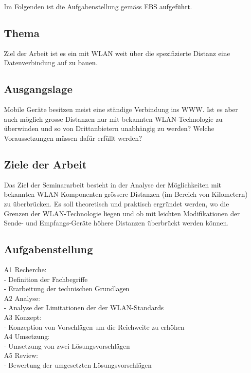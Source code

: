 \documentclass[oneside,11pt,parskip=half,ngerman]{scrreprt}
\begin{document}
Im Folgenden ist die Aufgabenstellung gemäss EBS aufgeführt.

\subsection{Thema}\label{thema}

Ziel der Arbeit ist es ein mit WLAN weit über die spezifizierte Distanz
eine Datenverbindung auf zu bauen.

\subsection{Ausgangslage}\label{ausgangslage}

Mobile Geräte besitzen meist eine ständige Verbindung ins WWW. Ist es
aber auch möglich grosse Distanzen nur mit bekannten WLAN-Technologie zu
überwinden und so von Drittanbietern unabhängig zu werden? Welche
Voraussetzungen müssen dafür erfüllt werden?

\subsection{Ziele der Arbeit}\label{ziele-der-arbeit}

Das Ziel der Seminararbeit besteht in der Analyse der Möglichkeiten mit
bekannten WLAN-Komponenten grössere Distanzen (im Bereich von
Kilometern) zu überbrücken. Es soll theoretisch und praktisch ergründet
werden, wo die Grenzen der WLAN-Technologie liegen und ob mit leichten
Modifikationen der Sende- und Empfangs-Geräte höhere Distanzen
überbrückt werden können.

\subsection{Aufgabenstellung}\label{aufgabenstellung-1}

A1 Recherche:\\- Definition der Fachbegriffe\\- Erarbeitung der
technischen Grundlagen\\A2 Analyse:\\- Analyse der Limitationen der der
WLAN-Standards\\A3 Konzept:\\- Konzeption von Vorschlägen um die
Reichweite zu erhöhen\\A4 Umsetzung:\\- Umsetzung von zwei
Lösungsvorschlägen\\A5 Review:\\- Bewertung der umgesetzten
Lösungsvorschlägen
\end{document}
